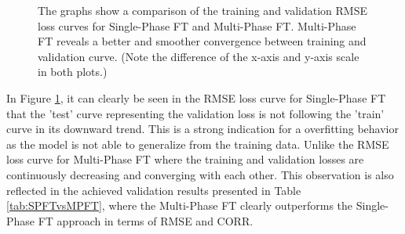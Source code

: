 \begin{figure}[htbp]
  \centering
  \hfill
  \caption[Ablation study: Multi-Phase FT loss curves]{The graphs show a comparison of the training and validation RMSE loss curves for Single-Phase FT and Multi-Phase FT. Multi-Phase FT reveals a better and smoother convergence between training and validation curve. (Note the difference of the x-axis and y-axis scale in both plots.)}
  \label{fig:SPFTvsMPFT}
\end{figure}

\noindent In Figure \ref{fig:SPFTvsMPFT}, it can clearly be seen in the RMSE loss curve for Single-Phase FT that the 'test' curve representing the validation loss is not following the 'train' curve in its downward trend. This is a strong indication for a overfitting behavior as the model is not able to generalize from the training data. Unlike the RMSE loss curve for Multi-Phase FT where the training and validation losses are continuously decreasing and converging with each other. This observation is also reflected in the achieved validation results presented in Table \ref{tab:SPFTvsMPFT}, where the Multi-Phase FT clearly outperforms the Single-Phase FT approach in terms of RMSE and CORR.

